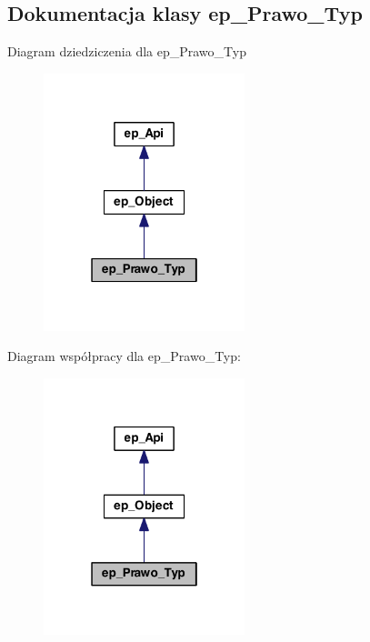 \hypertarget{classep___prawo___typ}{\subsection{Dokumentacja klasy ep\-\_\-\-Prawo\-\_\-\-Typ}
\label{classep___prawo___typ}
}


Diagram dziedziczenia dla ep\-\_\-\-Prawo\-\_\-\-Typ\nopagebreak
\begin{figure}[H]
\begin{center}
\leavevmode
\includegraphics[width=166pt]{classep___prawo___typ__inherit__graph}
\end{center}
\end{figure}


Diagram współpracy dla ep\-\_\-\-Prawo\-\_\-\-Typ\-:\nopagebreak
\begin{figure}[H]
\begin{center}
\leavevmode
\includegraphics[width=166pt]{classep___prawo___typ__coll__graph}
\end{center}
\end{figure}

